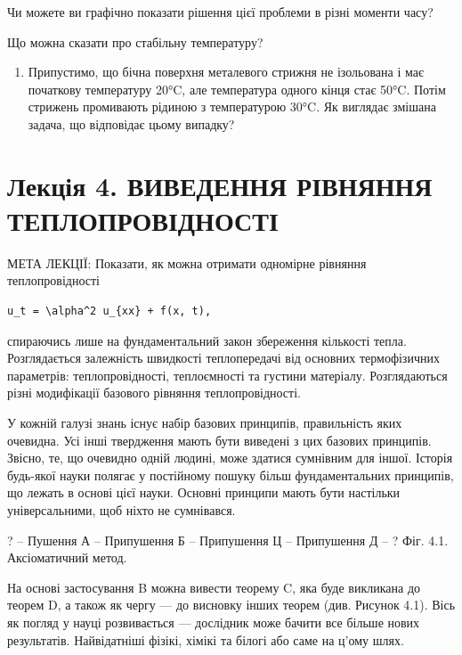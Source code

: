 \documentclass[
  ukrainian,
]{article}
\providecommand{\tightlist}{%
  \setlength{\itemsep}{0pt}\setlength{\parskip}{0pt}}
\begin{document}
Чи можете ви графічно показати рішення цієї проблеми в різні моменти
часу?

Що можна сказати про стабільну температуру?

\begin{enumerate}
\def\labelenumi{\arabic{enumi}.}
\setcounter{enumi}{3}
\tightlist
\item
  Припустимо, що бічна поверхня металевого стрижня не ізольована і має
  початкову температуру 20°C, але температура одного кінця стає 50°C.
  Потім стрижень промивають рідиною з температурою 30°C. Як виглядає
  змішана задача, що відповідає цьому випадку?
\end{enumerate}

\section{Лекція 4. ВИВЕДЕННЯ РІВНЯННЯ
ТЕПЛОПРОВІДНОСТІ}\label{ux43bux435ux43aux446ux456ux44f-4.-ux432ux438ux432ux435ux434ux435ux43dux43dux44f-ux440ux456ux432ux43dux44fux43dux43dux44f-ux442ux435ux43fux43bux43eux43fux440ux43eux432ux456ux434ux43dux43eux441ux442ux456}

МЕТА ЛЕКЦІЇ: Показати, як можна отримати одномірне рівняння
теплопровідності

\begin{verbatim}
u_t = \alpha^2 u_{xx} + f(x, t),
\end{verbatim}

спираючись лише на фундаментальний закон збереження кількості тепла.
Розглядається залежність швидкості теплопередачі від основних
термофізичних параметрів: теплопровідності, теплоємності та густини
матеріалу. Розглядаються різні модифікації базового рівняння
теплопровідності.

У кожній галузі знань існує набір базових принципів, правильність яких
очевидна. Усі інші твердження мають бути виведені з цих базових
принципів. Звісно, те, що очевидно одній людині, може здатися сумнівним
для іншої. Історія будь-якої науки полягає у постійному пошуку більш
фундаментальних принципів, що лежать в основі цієї науки. Основні
принципи мають бути настільки універсальними, щоб ніхто не сумнівався.

? -- Пушення А -- Припушення Б -- Припушення Ц -- Припушення Д -- ? Фіг.
4.1. Аксіоматичний метод.

На основі застосування B можна вивести теорему C, яка буде викликана до
теорем D, а також як чергу --- до висновку інших теорем (див. Рисунок
4.1). Вісь як погляд у науці розвивається --- дослідник може бачити все
більше нових результатів. Найвідатніші фізікі, хімікі та білогі або саме
на ц'ому шлях.
\end{document}
